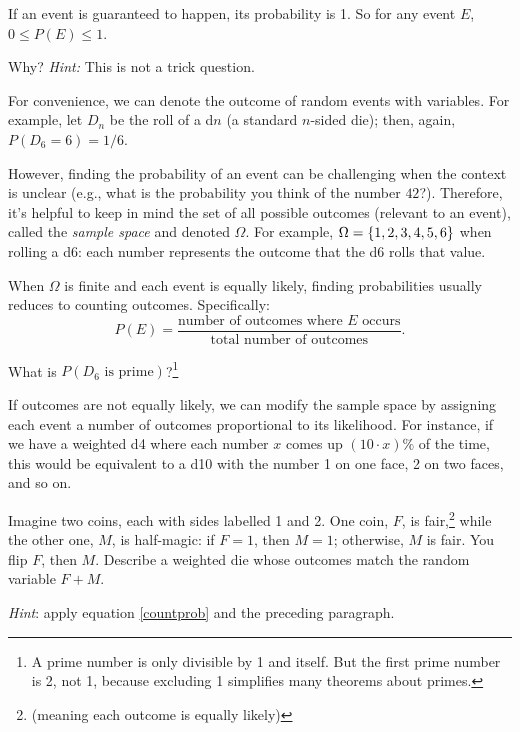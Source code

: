 \documentclass{book}
\begin{document}
If an event is guaranteed to happen, its probability is 1. So for any event $E$, $0 \leq P(E) \leq 1$.
\begin{exercise}
Why? \emph{Hint:} This is not a trick question.
\end{exercise}
For convenience, we can denote the outcome of random events with variables. For example, let $D_n$ be the roll of a d$n$ (a standard $n$-sided die); then, again, $P(D_6 = 6) = 1/6$.

However, finding the probability of an event can be challenging when the context is unclear (e.g., what is the probability you think of the number $42$?). Therefore, it's helpful to keep in mind the set of all possible outcomes (relevant to an event), called the \emph{sample space} and denoted $\Omega$. For example, $\Omega = \{1, 2, 3, 4, 5, 6\}$ when rolling a d6: each number represents the outcome that the d6 rolls that value.

When $\Omega$ is finite and each event is equally likely, finding probabilities usually reduces to counting outcomes. Specifically:
\begin{equation}\label{countprob}
P(E) = \frac{\text{number of outcomes where $E$ occurs}}{\text{total number of outcomes}}.
\end{equation}
\begin{exercise}
What is $P(D_6 \text{ is prime})$?\footnote{A prime number is only divisible by 1 and itself. But the first prime number is 2, not 1, because excluding 1 simplifies many theorems about primes.}
\end{exercise}

If outcomes are not equally likely, we can modify the sample space by assigning each event a number of outcomes proportional to its likelihood. For instance, if we have a weighted d4 where each number $x$ comes up $(10\cdot x)\%$ of the time, this would be equivalent to a d10 with the number 1 on one face, 2 on two faces, and so on. 
\begin{exercise}\label{magiccoin}
  Imagine two coins, each with sides labelled 1 and 2. One coin, $F$, is fair,\footnote{(meaning each outcome is equally likely)} while the other one, $M$, is half-magic: if $F = 1$, then $M = 1$; otherwise, $M$ is fair. You flip $F$, then $M$. Describe a weighted die whose outcomes match the random variable $F + M$.

\noindent\emph{Hint}: apply equation \eqref{countprob} and the preceding paragraph.
\end{exercise}
\end{document}

